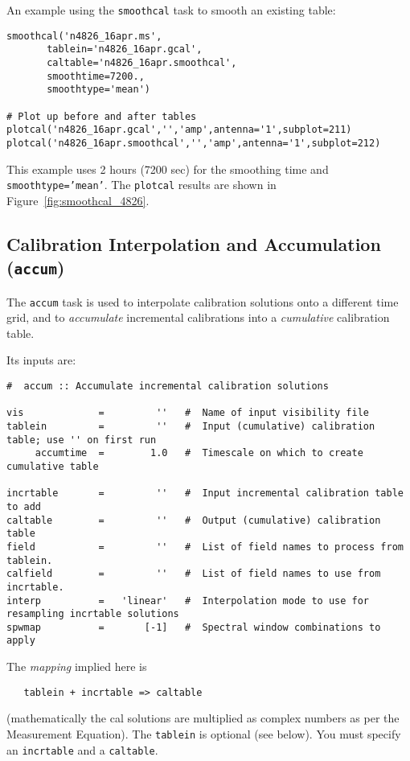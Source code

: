 An example using the {\tt smoothcal} task to smooth an existing table:
\small
\begin{verbatim}
smoothcal('n4826_16apr.ms',
       tablein='n4826_16apr.gcal',
       caltable='n4826_16apr.smoothcal',
       smoothtime=7200.,
       smoothtype='mean')

# Plot up before and after tables
plotcal('n4826_16apr.gcal','','amp',antenna='1',subplot=211)
plotcal('n4826_16apr.smoothcal','','amp',antenna='1',subplot=212)
\end{verbatim}
\normalsize
This example uses 2 hours (7200 sec) for the smoothing time and
{\tt smoothtype='mean'}.  The {\tt plotcal} results are shown
in Figure~\ref{fig:smoothcal_4826}.


\subsection{Calibration Interpolation and Accumulation ({\tt accum})}
\label{section:cal.tables.accum}

The {\tt accum} task is used to interpolate calibration solutions 
onto a different time grid, and to {\it accumulate} incremental
calibrations into a {\it cumulative} calibration table.

Its inputs are:
\small
\begin{verbatim}
#  accum :: Accumulate incremental calibration solutions

vis             =         ''   #  Name of input visibility file
tablein         =         ''   #  Input (cumulative) calibration table; use '' on first run
     accumtime  =        1.0   #  Timescale on which to create cumulative table

incrtable       =         ''   #  Input incremental calibration table to add
caltable        =         ''   #  Output (cumulative) calibration table
field           =         ''   #  List of field names to process from tablein.
calfield        =         ''   #  List of field names to use from incrtable.
interp          =   'linear'   #  Interpolation mode to use for resampling incrtable solutions
spwmap          =       [-1]   #  Spectral window combinations to apply
\end{verbatim}
\normalsize
The {\it mapping} implied here is 
\small
\begin{verbatim}
   tablein + incrtable => caltable
\end{verbatim}
\normalsize
(mathematically the cal solutions are multiplied as complex numbers
as per the Measurement Equation).
The {\tt tablein} is optional (see below).
You must specify an {\tt incrtable} and a {\tt caltable}.

